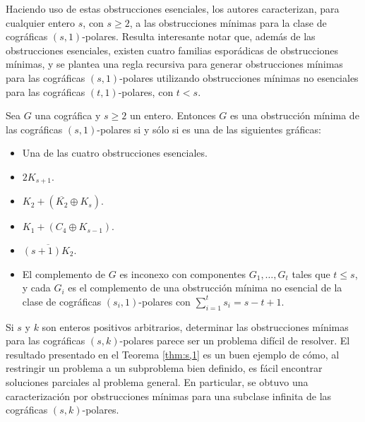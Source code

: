 Haciendo uso de estas obstrucciones esenciales,
los autores caracterizan, para cualquier entero
$s$, con $s \ge 2$, a las obstrucciones m\'inimas
para la clase de cogr\'aficas $(s,1)$-polares.
Resulta interesante notar que, adem\'as de las
obstrucciones esenciales, existen cuatro familias
espor\'adicas de obstrucciones m\'inimas, y se
plantea una regla recursiva para generar
obstrucciones m\'inimas para las cogr\'aficas
$(s,1)$-polares utilizando obstrucciones
m\'inimas no esenciales para las cogr\'aficas
$(t,1)$-polares, con $t < s$.

\begin{theorem}
\label{thm:s,1}
  Sea $G$ una cográfica y $s \ge 2$ un entero. Entonces
  $G$ es una obstrucción mínima de las cográficas
  $(s,1)$-polares si y sólo si es una de las siguientes
  gráficas:

  \begin{itemize}
    \item Una de las cuatro obstrucciones esenciales.

    \item $2K_{s+1}$.

    \item $K_2 + (\overline{K_2}\oplus K_s)$.

    \item $K_1 + (C_4 \oplus K_{s-1})$.

    \item $\overline{(s+1)K_2}$.

    \item El complemento de $G$ es inconexo con componentes
      $G_1, \dots, G_t$ tales que $t \leq s$, y cada $G_i$
      es el complemento de una obstrucción mínima no esencial
      de la clase de cográficas $(s_i, 1)$-polares con
      $\sum^{t}_{i=1}s_i = s-t+1$.
  \end{itemize}
\end{theorem}

Si $s$ y $k$ son enteros positivos arbitrarios, determinar
las obstrucciones m\'inimas para las cogr\'aficas
$(s,k)$-polares parece ser un problema dif\'icil de
resolver.   El resultado presentado en el Teorema
\ref{thm:s,1} es un buen ejemplo de c\'omo, al restringir
un problema a un subproblema bien definido, es f\'acil
encontrar soluciones parciales al problema general.   En
particular, se obtuvo una caracterizaci\'on por obstrucciones
m\'inimas para una subclase infinita de las cogr\'aficas
$(s,k)$-polares.

